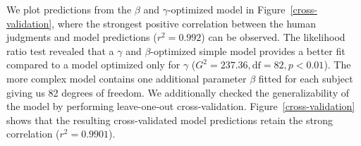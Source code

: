 \documentclass[10pt,a4paper]{article}
\begin{document}



 

We plot predictions from the $\beta$ and $\gamma$-optimized model in Figure~\ref{cross-validation}, where the strongest positive correlation between the human judgments and model predictions ($r^2 = 0.992$) can be observed. The likelihood ratio test revealed that a $\gamma$ and $\beta$-optimized simple model provides a better fit compared to a model optimized only for $\gamma$ ($G^2 = 237.36, \textrm{df} = 82, p < 0.01$). The more complex model contains one additional parameter $\beta$ fitted for each subject giving us 82 degrees of freedom. We additionally checked the generalizability of the model by performing leave-one-out cross-validation. Figure~\ref{cross-validation} shows that the resulting cross-validated model predictions retain the strong correlation ($r^{2}=0.9901$).
\end{document}
